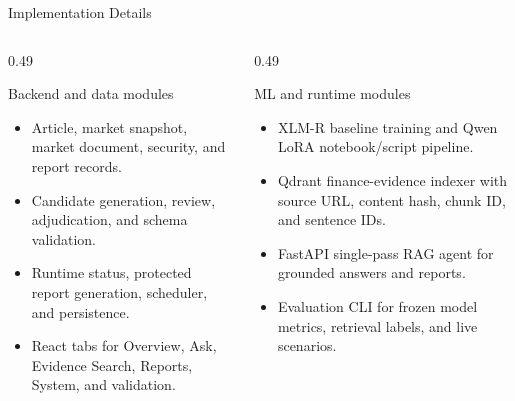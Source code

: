 \documentclass[aspectratio=169,11pt]{beamer}
\begin{document}
\begin{frame}{Implementation Details}
  \begin{columns}[T,onlytextwidth]
    \begin{column}{0.49\textwidth}
      \begin{block}{Backend and data modules}
        \begin{itemize}
          \item Article, market snapshot, market document, security, and report records.
          \item Candidate generation, review, adjudication, and schema validation.
          \item Runtime status, protected report generation, scheduler, and persistence.
          \item React tabs for Overview, Ask, Evidence Search, Reports, System, and validation.
        \end{itemize}
      \end{block}
    \end{column}
    \begin{column}{0.49\textwidth}
      \begin{block}{ML and runtime modules}
        \begin{itemize}
          \item XLM-R baseline training and Qwen LoRA notebook/script pipeline.
          \item Qdrant finance-evidence indexer with source URL, content hash, chunk ID, and sentence IDs.
          \item FastAPI single-pass RAG agent for grounded answers and reports.
          \item Evaluation CLI for frozen model metrics, retrieval labels, and live scenarios.
        \end{itemize}
      \end{block}
    \end{column}
  \end{columns}
\end{frame}
\end{document}
